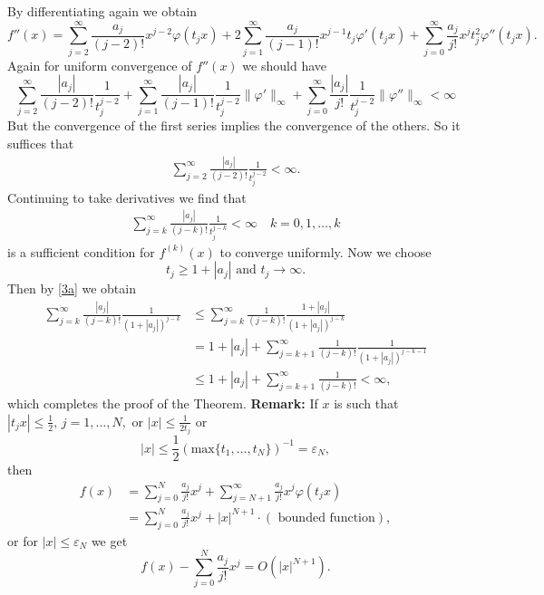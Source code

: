 \documentclass[12pt,reqno]{amsart}
\theoremstyle{plain}  %
\theoremstyle{definition}
\newcommand{\ve}{\varepsilon}
\newcommand{\nin}{\noindent}
\newcommand{\vph}{\varphi}
\begin{document}
By differentiating again we obtain
$$
f''(x) = \sum^\infty_{j=2} \frac{a_j}{(j-2)!} x^{j-2} \vph
(t_jx)+2\sum^\infty_{j=1} \frac{a_j}{(j-1)!} x^{j-1}t_j
\vph '(t_jx) +
\sum^\infty_{j=0} \frac{a_j}{j!} x^j t^2_j \vph''(t_jx). $$
Again for uniform convergence of $f''(x)$  we should have
$$\sum^\infty_{j=2} \frac{|a_j|}{(j-2)!} \frac{1}{t_j^{j-2}} +
\sum^\infty_{j=1} \frac{|a_j|}{(j-1)!} \frac{1}{t_j^{j-2}} \|
\vph'\|_\infty + \sum^\infty_{j=0} \frac{|a_j|}{j!} \frac{1}{t^{j-2}_j}\|
\vph'' \|_\infty< \infty$$
%
But the convergence of the first series implies the convergence of the others.
 So  it suffices that
 \begin{equation}
	 \begin{split}
		 \sum^\infty_{j=2} \frac{|a_j|}{(j-2)!}
\frac{1}{t_j^{j-2}} < \infty. 
		 \label{2a}
	 \end{split}
 \end{equation}
%
Continuing to take derivatives we find that
\begin{equation}
	\begin{split}
		 \sum^\infty_{j=k}\frac{|a_j|}{(j-k)!}
 \frac{1}{t_j^{j-k}}<\infty
 \quad  k = 0,1,\dots,k
		\label{3a}
	\end{split}
\end{equation}
%
 is a sufficient condition for $f^{(k)}(x)$ to converge uniformly.
\medskip
\nin
Now we choose 
$$t_j \ge 1+|a_j| \text{ and }t_j \longrightarrow \infty.$$  Then
by \eqref{3a} we obtain 
 \begin{equation*}
	 \begin{split}
 \sum^\infty_{j=k} \frac{|a_j|}{(j-k)!}
\frac{1}{(1+|a_j|)^{j-k}} &\le \sum^\infty_{j=k} \frac{1}{(j-k)!}
\frac{1+|a_j|}{(1+|a_j|)^{j-k}}\\
&=1+|a_j| + \sum^\infty_{j=k+1} \frac{1}{(j-k)!} \frac{1}{(1+|a_j|)^{j-k-1}}\\
&\le 1+|a_j| +\sum^\infty_{j=k+1}\frac{1}{(j-k)!} <\infty,
\end{split}
\end{equation*}
which completes the proof of the Theorem.
\vskip0.2in
\nin
{\bf Remark:}
If $ x $ is such that 
$ |t_jx| \le \frac{1}{2},\,  j=1,\dots,N,$
 or  $ |x| \le\frac{1}{2t_j}$ or   
$$ |x| \le \frac{1}{2}(\text{max}\{t_1,\dots,t_N\})^{-1}=\ve_N,$$
then
\begin{equation*}
	\begin{split}
f(x) &= \sum^N_{j=0} \frac{a_j}{j!} x^j + \sum^\infty_{j=N+1}\frac{a_j}{j!}x^j
\vph(t_jx)\\ 
&= \sum^N_{j=0} \frac{a_j}{j!} x^j + |x|^{N+1}\cdot(\text{ bounded
function}),
\end{split}
\end{equation*}
or for $|x| \le \ve_N$ we get
$$f(x)-\sum^N_{j=0} \frac{a_j}{j!} x^j = O (|x|^{N+1}).$$
\end{document}
